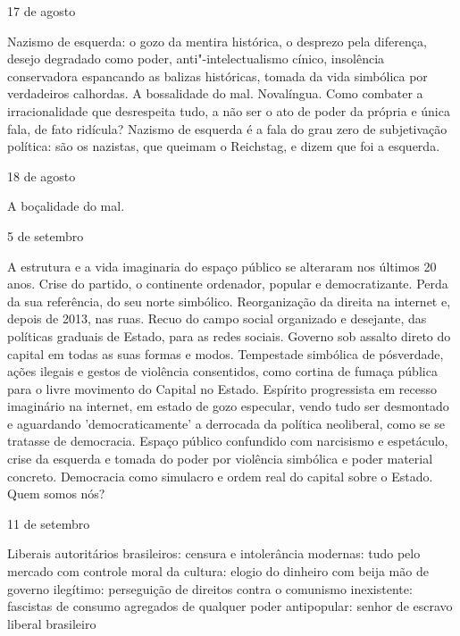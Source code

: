 \begin{flushright}
17 de agosto
\end{flushright}

Nazismo de esquerda: o gozo da mentira histórica, o desprezo pela
diferença, desejo degradado como poder, anti"-intelectualismo cínico,
insolência conservadora espancando as balizas históricas, tomada da vida
simbólica por verdadeiros calhordas. A bossalidade do mal. Novalíngua.
Como combater a irracionalidade que desrespeita tudo, a não ser o ato de
poder da própria e única fala, de fato ridícula? Nazismo de esquerda é a
fala do grau zero de subjetivação política: são os nazistas, que queimam
o Reichstag, e dizem que foi a esquerda.

\begin{flushright}
18 de agosto
\end{flushright}

A boçalidade do mal.

\begin{flushright}
5 de setembro
\end{flushright}

A estrutura e a vida imaginaria do espaço público se alteraram nos
últimos 20 anos. Crise do partido, o continente ordenador, popular e
democratizante. Perda da sua referência, do seu norte simbólico.
Reorganização da direita na internet e, depois de 2013, nas ruas. Recuo
do campo social organizado e desejante, das políticas graduais de
Estado, para as redes sociais. Governo sob assalto direto do capital em
todas as suas formas e modos. Tempestade simbólica de pósverdade, ações
ilegais e gestos de violência consentidos, como cortina de fumaça
pública para o livre movimento do Capital no Estado. Espírito
progressista em recesso imaginário na internet, em estado de gozo
especular, vendo tudo ser desmontado e aguardando 'democraticamente' a
derrocada da política neoliberal, como se se tratasse de democracia.
Espaço público confundido com narcisismo e espetáculo, crise da esquerda
e tomada do poder por violência simbólica e poder material concreto.
Democracia como simulacro e ordem real do capital sobre o Estado. Quem
somos nós?

\begin{flushright}
11 de setembro
\end{flushright}

Liberais autoritários brasileiros: censura e intolerância modernas: tudo
pelo mercado com controle moral da cultura: elogio do dinheiro com beija
mão de governo ilegítimo: perseguição de direitos contra o comunismo
inexistente: fascistas de consumo agregados de qualquer poder
antipopular: senhor de escravo liberal brasileiro

